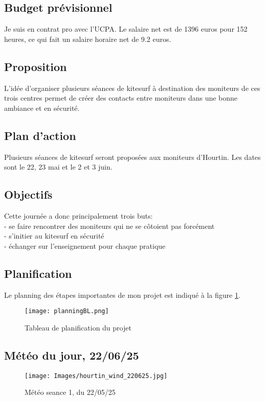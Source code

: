 \documentclass[12pt,a4paper]{report}
\begin{document}
\subsection{Budget prévisionnel}
Je suis en contrat pro avec l'UCPA. Le salaire net est de 1396 euros pour 152 heures, 
ce qui fait un salaire horaire net de 9.2 euros.
\subsection{Proposition}
L'idée d'organiser plusieurs séances de  kitesurf à destination des moniteurs
de ces trois centres permet  de créer des contacts 
entre moniteurs dans une bonne ambiance et en sécurité.

\subsection{Plan d'action}
Plusieurs séances de kitesurf seront proposées aux moniteurs d'Hourtin.
Les dates sont le 22, 23 mai et le 2 et 3 juin.
\subsection{Objectifs}
Cette journée a donc principalement trois buts:\\
- se faire rencontrer des moniteurs qui ne se côtoient pas forcément \\
- s'initier au kitesurf en sécurité \\
- échanger sur l'enseignement pour chaque pratique \\

\subsection{Planification}
Le planning des étapes importantes de mon projet est indiqué
à la figure \ref{gantt}.

\begin{figure}
\centering
\texttt{[image: planningBL.png]} 
\caption{Tableau de planification du projet \label{gantt}}
\end{figure}
\subsection{Météo du jour, 22/06/25}
\begin{figure}
\texttt{[image: Images/hourtin\_wind\_220625.jpg]} 
\caption{Météo seance 1, du 22/05/25}
\end{figure}
\end{document}
